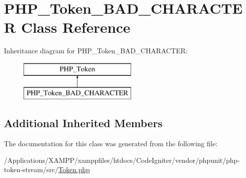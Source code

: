 \hypertarget{class_p_h_p___token___b_a_d___c_h_a_r_a_c_t_e_r}{}\section{P\+H\+P\+\_\+\+Token\+\_\+\+B\+A\+D\+\_\+\+C\+H\+A\+R\+A\+C\+T\+ER Class Reference}
\label{class_p_h_p___token___b_a_d___c_h_a_r_a_c_t_e_r}
Inheritance diagram for P\+H\+P\+\_\+\+Token\+\_\+\+B\+A\+D\+\_\+\+C\+H\+A\+R\+A\+C\+T\+ER\+:\begin{figure}[H]
\begin{center}
\leavevmode
\includegraphics[height=2.000000cm]{class_p_h_p___token___b_a_d___c_h_a_r_a_c_t_e_r}
\end{center}
\end{figure}
\subsection*{Additional Inherited Members}


The documentation for this class was generated from the following file\+:\begin{DoxyCompactItemize}
\item 
/\+Applications/\+X\+A\+M\+P\+P/xamppfiles/htdocs/\+Code\+Igniter/vendor/phpunit/php-\/token-\/stream/src/\mbox{\hyperlink{_token_8php}{Token.\+php}}\end{DoxyCompactItemize}

